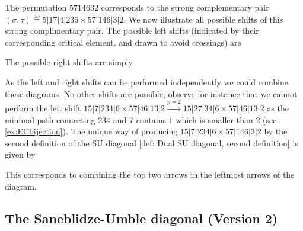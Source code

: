 \begin{example} \label{ex:shifts}
The permutation $5714632$ corresponds to the strong complementary pair $(\sigma,\tau)  \eqdef  5|17|4|236 \times 57|146|3|2$. We now illustrate all possible shifts of this strong complimentary pair. The possible left shifts (indicated by their corresponding critical element, and drawn to avoid crossings) are
\begin{center}
\end{center}
The possible right shifts are simply
\begin{center}
\end{center}
As the left and right shifts can be performed independently we could combine these diagrams.
No other shifts are possible, observe for instance that we cannot perform the left shift $15|7|234|6 \times 57|46|13|2 \xrightarrow{p=2} 15|27|34|6 \times 57|46|13|2$ as the minimal path connecting $234$ and $7$ contains $1$ which is smaller than $2$ (see \cref{ex:ECbijection}). The unique way of producing $15|7|234|6 \times 57|146|3|2$ by the second definition of the SU diagonal \cref{def: Dual SU diagonal, second definition} is given by
\begin{center}
\end{center}
This corresponds to combining the top two arrows in the leftmost arrows of the diagram.
\end{example}

\subsection{The Saneblidze-Umble diagonal (Version 2)}

